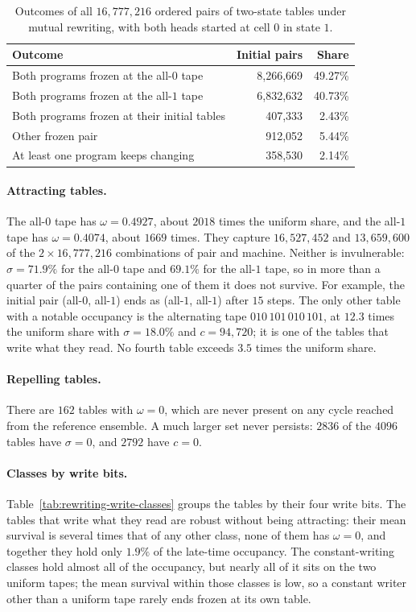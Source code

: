 \documentclass{article}
\begin{document}
\begin{table}[h]
\centering
\caption{Outcomes of all $16{,}777{,}216$ ordered pairs of two-state
tables under mutual rewriting, with both heads started at cell $0$ in
state $1$.}
\label{tab:rewriting-outcomes}
\begin{tabular}{lrr}
\toprule
Outcome & Initial pairs & Share \\
\midrule
Both programs frozen at the all-$0$ tape & 8,266,669 & 49.27\% \\
Both programs frozen at the all-$1$ tape & 6,832,632 & 40.73\% \\
Both programs frozen at their initial tables & 407,333 & 2.43\% \\
Other frozen pair & 912,052 & 5.44\% \\
At least one program keeps changing & 358,530 & 2.14\% \\
\bottomrule
\end{tabular}
\end{table}

\paragraph{Attracting tables.}
The all-$0$ tape has $\omega=0.4927$, about $2018$ times the uniform
share, and the all-$1$ tape has $\omega=0.4074$, about $1669$ times.  They
capture $16{,}527{,}452$ and $13{,}659{,}600$ of the
$2\times16{,}777{,}216$ combinations of pair and machine.  Neither is
invulnerable: $\sigma=71.9\%$ for the all-$0$ tape and $69.1\%$ for the
all-$1$ tape, so in more than a quarter of the pairs containing one of
them it does not survive.  For example, the initial pair (all-$0$, all-$1$)
ends as (all-$1$, all-$1$) after $15$ steps.  The only other table with a
notable occupancy is the alternating tape $010\,101\,010\,101$, at $12.3$
times the uniform share with $\sigma=18.0\%$ and $c=94{,}720$; it is one of
the tables that write what they read.  No fourth table exceeds $3.5$ times
the uniform share.

\paragraph{Repelling tables.}
There are $162$ tables with $\omega=0$, which are never present on any
cycle reached from the reference ensemble.  A much larger set never
persists: $2836$ of the $4096$ tables have $\sigma=0$, and $2792$ have
$c=0$.

\paragraph{Classes by write bits.}
Table~\ref{tab:rewriting-write-classes} groups the tables by their four
write bits.  The tables that write what they read are robust without being
attracting: their mean survival is several times that of any other class,
none of them has $\omega=0$, and together they hold only $1.9\%$ of the
late-time occupancy.  The constant-writing classes hold almost all of the
occupancy, but nearly all of it sits on the two uniform tapes; the mean
survival within those classes is low, so a constant writer other than a
uniform tape rarely ends frozen at its own table.
\end{document}
